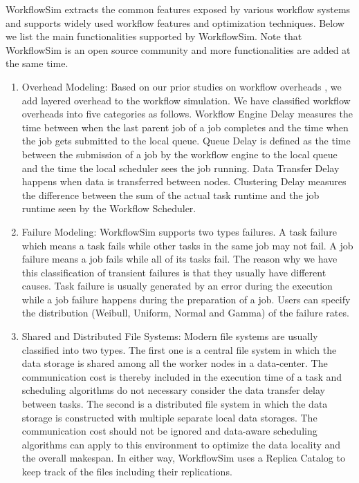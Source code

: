 WorkflowSim extracts the common features exposed by various workflow systems and supports widely used workflow features and optimization techniques. Below we list the main functionalities supported by WorkflowSim. Note that WorkflowSim is an open source community and more functionalities are added at the same time. 

\begin{enumerate}
\item{Overhead Modeling}: Based on our prior studies on workflow overheads \cite{Chen2011}, we add layered overhead to the workflow simulation. We have classified workflow overheads into five categories as follows. Workflow Engine Delay measures the time between when the last parent job of a job completes and the time when the job gets submitted to the local queue. Queue Delay is defined as the time between the submission of a job by the workflow engine to the local queue and the time the local scheduler sees the job running. Data Transfer Delay happens when data is transferred between nodes. Clustering Delay measures the difference between the sum of the actual task runtime and the job runtime seen by the Workflow Scheduler. 

\item{Failure Modeling}: WorkflowSim supports two types failures. A task failure which means a task fails while other tasks in the same job may not fail. A job failure means a job fails while all of its tasks fail. The reason why we have this classification of transient failures is that they usually have different causes. Task failure is usually generated by an error during the execution while a job failure happens during the preparation of a job.   Users can specify the distribution (Weibull, Uniform, Normal and Gamma) of the failure rates. 

\item{Shared and Distributed File Systems}: Modern file systems are usually classified into two types. The first one is a central file system in which the data storage is shared among all the worker nodes in a data-center. The communication cost is thereby included in the execution time of a task and scheduling algorithms do not necessary consider the data transfer delay between tasks. The second is a distributed file system in which the data storage is constructed with multiple separate local data storages. The communication cost should not be ignored and data-aware scheduling algorithms can apply to this environment to optimize the data locality and the overall makespan. In either way, WorkflowSim uses a Replica Catalog to keep track of the files including their replications. 


\end{enumerate}
